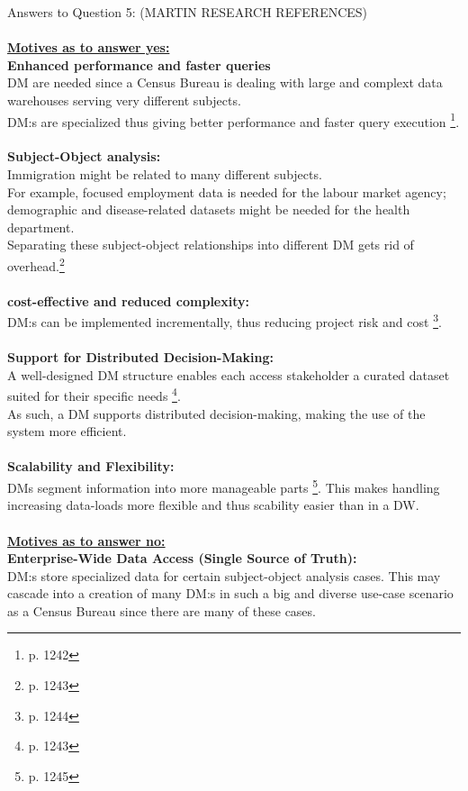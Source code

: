 \newpage Answers to Question 5: (MARTIN RESEARCH REFERENCES)\\\\
\textbf{\underline{Motives as to answer yes:}}\\
\textbf{Enhanced performance and faster queries}\\
DM are needed since a Census Bureau is dealing with large and complext data warehouses serving very different subjects.\\
DM:s are specialized thus giving better performance and faster query execution \footnote{p. 1242}.
\\\\
\textbf{Subject-Object analysis:}\\
Immigration might be related to many different subjects.\\
For example, focused employment data is needed for the labour market agency;\\
demographic and disease-related datasets might be needed for the health department.\\
Separating these subject-object relationships into different DM gets rid of overhead.\footnote{p. 1243}\\
\\
\textbf{cost-effective and reduced complexity:}\\
DM:s can be implemented incrementally, thus reducing project risk and cost \footnote{p. 1244}.
\\\\
\textbf{Support for Distributed Decision-Making:}\\
A well-designed DM structure enables each access stakeholder a curated dataset suited for their specific needs \footnote{p. 1243}.\\
As such, a DM supports distributed decision-making, making the use of the system more efficient.
\\\\
\textbf{Scalability and Flexibility:}\\
DMs segment information into more manageable parts \footnote{p. 1245}. 
This makes handling increasing data-loads more flexible and thus scability easier than in a DW.
\\\\
\textbf{\underline{Motives as to answer no:}}\\
\textbf{Enterprise-Wide Data Access (Single Source of Truth):}\\
DM:s store specialized data for certain subject-object analysis cases. 
This may cascade into a creation of many DM:s in such a big and diverse use-case scenario as a Census Bureau since there are many of these cases.
